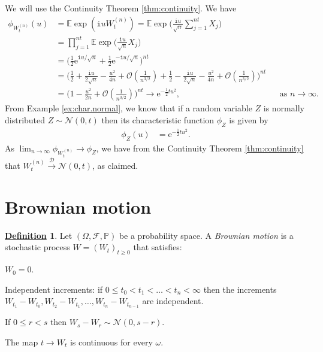 \documentclass[12pt]{book}
\numberwithin{equation}{chapter}
\theoremstyle{plain}
\numberwithin{theorem}{section}
\theoremstyle{definition}
\newtheorem{definition}[theorem]{\underline{Definition}}
\numberwithin{exercise}{chapter}
\let\oldendproof\endproof
\renewenvironment{proof}[1][\proofname]{%
  \oldproof[\scshape\underline{#1}]%
}{\oldendproof}
\newcommand{\<}{\langle}
\renewcommand{\>}{\rangle}
\renewcommand{\(}{\left(}
\renewcommand{\)}{\right)}
\renewcommand{\[}{\left[}
\renewcommand{\]}{\right]}
\newcommand\Eb{\mathds{E}}
\newcommand\Pb{\mathds{P}}
\newcommand\Dc{\mathscr{D}}
\newcommand\Fc{\mathscr{F}}
\newcommand\Nc{\mathscr{N}}
\newcommand\Oc{\mathscr{O}}
\newcommand\om{\omega}
\newcommand\Om{\Omega}
\newcommand\ii{\mathtt{i}}
\newcommand\ee{\mathrm{e}}
\begin{document}
\begin{proof}
We will use the Continuity Theorem \ref{thm:continuity}.  We have
\begin{align}
\phi_{W_t^{(n)}}(u)
	&=	\Eb \exp \( \ii u W_t^{(n)} \)
	=		\Eb \exp \Big( \frac{ \ii u}{\sqrt{n}} \sum_{j=1}^{nt} X_j \Big) \\
	&=	\prod_{j=1}^{nt} \Eb \exp \Big( \frac{\ii u}{\sqrt{n}}  X_j \Big) \\
	&=	\Big( \tfrac{1}{2} \ee^{\ii u/\sqrt{n}} + \tfrac{1}{2} \ee^{-\ii u/\sqrt{n}} \Big)^{nt}  \\
	&=	\Big( \frac{1}{2} + \frac{\ii u}{2\sqrt{n}} - \frac{u^2}{4n} + \Oc(\tfrac{1}{n^{3/2}})
				+ \frac{1}{2} - \frac{\ii u}{2\sqrt{n}} - \frac{u^2}{4n} + \Oc(\tfrac{1}{n^{3/2}}) \Big)^{nt} \\
	&=	\Big( 1 - \frac{u^2}{2n } + \Oc(\tfrac{1}{n^{3/2}}) \Big)^{nt}
	\to \ee^{-\tfrac{1}{2} t u^2 } , &
	&		\text{as $n \to \infty$}.
\end{align}
From Example \ref{ex:char.normal}, we know that if a random variable $Z$ is normally distributed $Z \sim \Nc(0,t)$ then its characteristic function $\phi_Z$ is given by
\begin{align}
\phi_{Z}(u)
	&=	\ee^{-\tfrac{1}{2} t u^2 } .
\end{align}
As $\lim_{n \to \infty} \phi_{W_t^{(n)}} \to \phi_{Z}$, we have from the Continuity Theorem \ref{thm:continuity} that $W_t^{(n)} \stackrel{\Dc}{\to} \Nc(0,t)$, as claimed.
\end{proof}


\section{Brownian motion}

\begin{definition}
\label{def:bm}
Let $(\Om, \Fc, \Pb)$ be a probability space.
A \emph{Brownian motion} is a stochastic process $W = (W_t)_{t \geq 0}$ that satisfies:
\begin{enumerate*}
\item $W_0 = 0$.
\item Independent increments: if $0 \leq t_0 < t_1 < \ldots < t_n < \infty$ then the increments $W_{t_1} - W_{t_0}, W_{t_2} - W_{t_1}, \ldots, W_{t_n} - W_{t_{n-1}}$ are independent.
\item If $0 \leq r < s$ then $W_s - W_r \sim \Nc(0,s-r)$.
\item The map $t \to W_t$ is continuous for every $\om$.
\end{enumerate*}
\end{definition}
\end{document}
